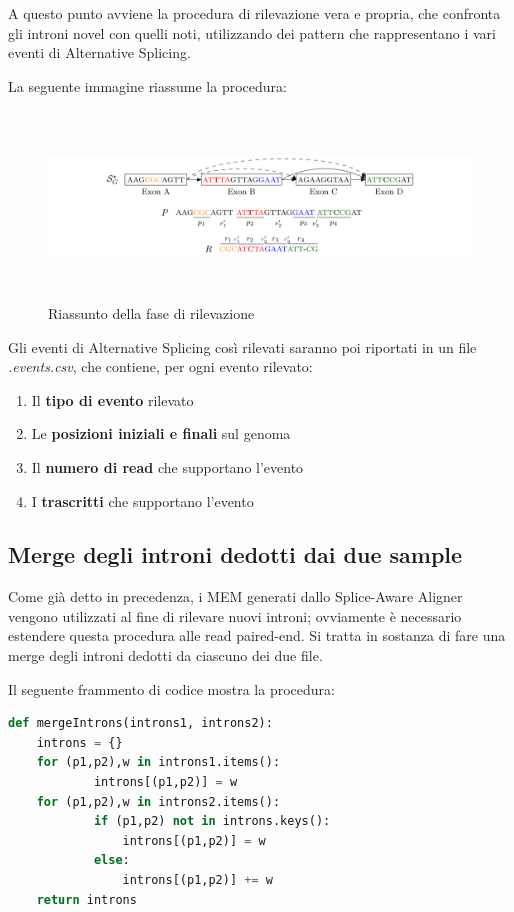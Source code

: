 A questo punto avviene la procedura di rilevazione vera e propria, che confronta gli introni novel con quelli noti, utilizzando dei pattern che rappresentano i vari eventi di Alternative Splicing.

La seguente immagine riassume la procedura:

\begin{figure}[h!]
	\centering
	\includegraphics[width=\linewidth, height=5cm]{images/riassuntorilevazione.png}
  \caption{Riassunto della fase di rilevazione}
  \label{fig:Summary2}
\end{figure}

\newpage

Gli eventi di Alternative Splicing così rilevati saranno poi riportati in un file \textit{.events.csv}, che contiene, per ogni evento rilevato:
\begin{enumerate}
	\item Il \textbf{tipo di evento} rilevato
	\item Le \textbf{posizioni iniziali e finali} sul genoma
	\item Il \textbf{numero di read} che supportano l'evento
	\item I \textbf{trascritti} che supportano l'evento
\end{enumerate}

\subsection{Merge degli introni dedotti dai due sample}

Come già detto in precedenza, i MEM generati dallo Splice-Aware Aligner vengono utilizzati al fine di rilevare nuovi introni; ovviamente è necessario estendere questa procedura alle read paired-end. Si tratta in sostanza di fare una merge degli introni dedotti da ciascuno dei due file.

Il seguente frammento di codice mostra la procedura:

\begin{lstlisting}[language=Python]
def mergeIntrons(introns1, introns2):
    introns = {}
    for (p1,p2),w in introns1.items():
            introns[(p1,p2)] = w
    for (p1,p2),w in introns2.items():
            if (p1,p2) not in introns.keys():
                introns[(p1,p2)] = w
            else:
                introns[(p1,p2)] += w
    return introns
\end{lstlisting}

